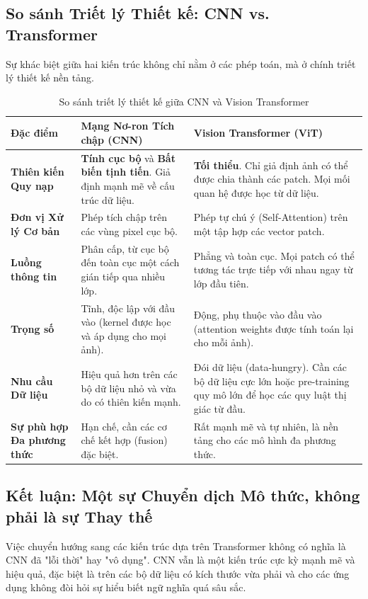 \subsection{So sánh Triết lý Thiết kế: CNN vs. Transformer}
\label{subsec:philosophy_comparison}
Sự khác biệt giữa hai kiến trúc không chỉ nằm ở các phép toán, mà ở chính triết lý thiết kế nền tảng.

\begin{table}[h!]
	\centering
	\caption{So sánh triết lý thiết kế giữa CNN và Vision Transformer}
	\label{tab:cnn_vs_transformer_philosophy}
	\begin{tabularx}{\textwidth}{|l|X|X|}
		\hline
		\textbf{Đặc điểm} & \textbf{Mạng Nơ-ron Tích chập (CNN)} & \textbf{Vision Transformer (ViT)} \\
		\hline
		\textbf{Thiên kiến Quy nạp} & \textbf{Tính cục bộ} và \textbf{Bất biến tịnh tiến}. Giả định mạnh mẽ về cấu trúc dữ liệu. & \textbf{Tối thiểu}. Chỉ giả định ảnh có thể được chia thành các patch. Mọi mối quan hệ được học từ dữ liệu. \\
		\hline
		\textbf{Đơn vị Xử lý Cơ bản} & Phép tích chập trên các vùng pixel cục bộ. & Phép tự chú ý (Self-Attention) trên một tập hợp các vector patch. \\
		\hline
		\textbf{Luồng thông tin} & Phân cấp, từ cục bộ đến toàn cục một cách gián tiếp qua nhiều lớp. & Phẳng và toàn cục. Mọi patch có thể tương tác trực tiếp với nhau ngay từ lớp đầu tiên. \\
		\hline
		\textbf{Trọng số} & Tĩnh, độc lập với đầu vào (kernel được học và áp dụng cho mọi ảnh). & Động, phụ thuộc vào đầu vào (attention weights được tính toán lại cho mỗi ảnh). \\
		\hline
		\textbf{Nhu cầu Dữ liệu} & Hiệu quả hơn trên các bộ dữ liệu nhỏ và vừa do có thiên kiến mạnh. & Đói dữ liệu (data-hungry). Cần các bộ dữ liệu cực lớn hoặc pre-training quy mô lớn để học các quy luật thị giác từ đầu. \\
		\hline
		\textbf{Sự phù hợp Đa phương thức} & Hạn chế, cần các cơ chế kết hợp (fusion) đặc biệt. & Rất mạnh mẽ và tự nhiên, là nền tảng cho các mô hình đa phương thức. \\
		\hline
	\end{tabularx}
\end{table}

\subsection{Kết luận: Một sự Chuyển dịch Mô thức, không phải là sự Thay thế}
\label{subsec:paradigm_shift_conclusion}
Việc chuyển hướng sang các kiến trúc dựa trên Transformer không có nghĩa là CNN đã "lỗi thời" hay "vô dụng". CNN vẫn là một kiến trúc cực kỳ mạnh mẽ và hiệu quả, đặc biệt là trên các bộ dữ liệu có kích thước vừa phải và cho các ứng dụng không đòi hỏi sự hiểu biết ngữ nghĩa quá sâu sắc.


